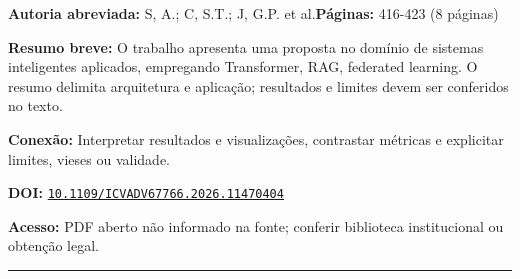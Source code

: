\documentclass[10pt,a4paper]{article}
\begin{document}
\textbf{Autoria abreviada:} S, A.; C, S.T.; J, G.P. et al.\quad \textbf{Páginas:} 416-423 (8 páginas)\par
\textbf{Resumo breve:} O trabalho apresenta uma proposta no domínio de sistemas inteligentes aplicados, empregando Transformer, RAG, federated learning. O resumo delimita arquitetura e aplicação; resultados e limites devem ser conferidos no texto.\par
\textbf{Conexão:} Interpretar resultados e visualizações, contrastar métricas e explicitar limites, vieses ou validade.\par
\textbf{DOI:} \href{https://doi.org/10.1109/ICVADV67766.2026.11470404}{\nolinkurl{10.1109/ICVADV67766.2026.11470404}}\par
\textbf{Acesso:} PDF aberto não informado na fonte; conferir biblioteca institucional ou obtenção legal.\par
\noindent\rule{\textwidth}{0.35pt}
\clearpage
\end{document}
